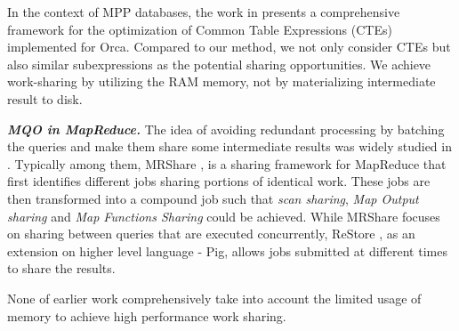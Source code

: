 In the context of MPP databases, the work in \cite{el2015optimization} presents a comprehensive framework for the optimization of Common Table Expressions (CTEs) implemented for Orca. Compared to our method, we not only consider CTEs but also similar subexpressions as the potential sharing opportunities. We achieve work-sharing by utilizing the RAM memory, not by materializing intermediate result to disk.

\emph{\textbf{MQO in MapReduce.}} The idea of avoiding redundant processing by batching the queries and make them share some intermediate results was widely studied in \cite{mrshare, mqo, agrawal2008scheduling, bhatotia2011incoop, elghandour2012restore, silva2012exploiting, li2011platform, li2012scalla}. Typically among them, MRShare \cite{mrshare}, is a sharing framework for MapReduce that first identifies different jobs sharing portions of identical work. These jobs are then transformed into a compound job such that \emph{scan sharing}, \emph{Map Output sharing} and \emph{Map Functions Sharing} could be achieved. While MRShare focuses on sharing between queries that are executed concurrently, ReStore \cite{elghandour2012restore}, as an extension on higher level language - Pig, allows jobs submitted at different times to share the results.

None of earlier work comprehensively take into account the limited usage of memory to achieve high performance work sharing.
